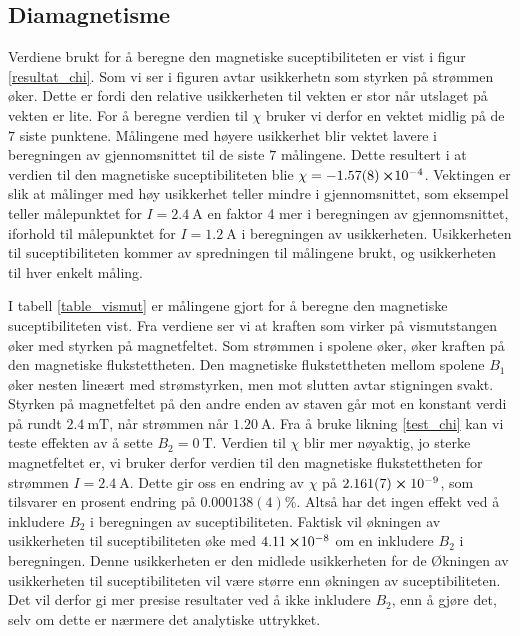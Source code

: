\documentclass[%
 reprint,
 amsmath,amssymb,
 aps,
]{revtex4-1}
\begin{document}
\subsection{Diamagnetisme}
Verdiene brukt for å beregne den magnetiske suceptibiliteten er vist i figur \vref{resultat_chi}. Som vi ser i figuren avtar usikkerhetn som styrken på strømmen øker. Dette er fordi den relative usikkerheten til vekten er stor når utslaget på vekten er lite. For å beregne verdien til $\chi$ bruker vi derfor en vektet midlig på de $7$ siste punktene. Målingene med høyere usikkerhet blir vektet lavere i beregningen av gjennomsnittet til de siste $7$ målingene. Dette resultert i at verdien til den magnetiske suceptibiliteten blie $\chi = -\SI{1.57\pm0.08}\cross 10^{-4}$. Vektingen er slik at målinger med høy usikkerhet teller mindre i gjennomsnittet, som eksempel teller målepunktet for $I=\SI{2.4}{\ampere}$ en faktor 4 mer i beregningen av gjennomsnittet, iforhold til målepunktet for $I=\SI{1.2}{\ampere}$ i beregningen av usikkerheten. Usikkerheten til suceptibiliteten kommer av spredningen til målingene brukt, og usikkerheten til hver enkelt måling.\par
I tabell \vref{table_vismut} er målingene gjort for å beregne den magnetiske suceptibiliteten vist. Fra verdiene ser vi at kraften som virker på vismutstangen øker med styrken på magnetfeltet. Som strømmen i spolene øker, øker kraften på den magnetiske flukstettheten. Den magnetiske flukstettheten mellom spolene $B_1$ øker nesten lineært med strømstyrken, men mot slutten avtar stigningen svakt. Styrken på magnetfeltet på den andre enden av staven går mot en konstant verdi på rundt $\SI{2.4}{\milli\tesla}$, når strømmen når $\SI{1.20}{\ampere}$. Fra å bruke likning \eqref{test_chi} kan vi teste effekten av å sette $B_2=\SI{0}{\tesla}$. Verdien til $\chi$ blir mer nøyaktig, jo sterke magnetfeltet er, vi bruker derfor verdien til den magnetiske flukstettheten for strømmen $I=\SI{2.4}{\ampere}$. Dette gir oss en endring av $\chi$
på $2.161(7)\cross10^{-9}$, som tilsvarer en prosent endring på $0.000138(4)\%$. Altså har det ingen effekt ved å inkludere $B_2$ i beregningen av suceptibiliteten. Faktisk vil økningen av usikkerheten til suceptibiliteten øke med $\SI{4.11}\cross 10^{-8}$ om en inkludere $B_2$ i beregningen. Denne usikkerheten er den midlede usikkerheten for de  Økningen av usikkerheten til suceptibiliteten vil være større enn økningen av suceptibiliteten. Det vil derfor gi mer presise resultater ved å ikke inkludere $B_2$, enn å gjøre det, selv om dette er nærmere det analytiske uttrykket. \\
\end{document}
